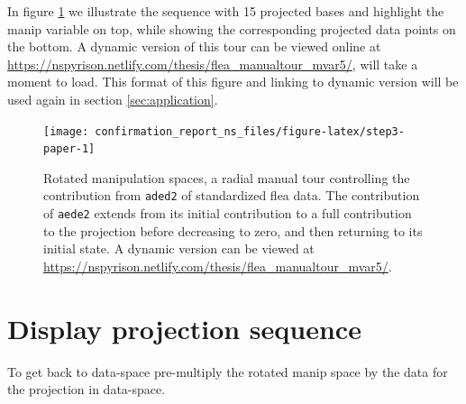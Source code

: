 \documentclass{monashthesis}
\begin{document}
\begin{Shaded}
\begin{Highlighting}[]
 
\StringTok{ }\OperatorTok{+}\StringTok{ }
\StringTok{ }\NormalTok{(manip_space, theta, phi)[, }\OperatorTok{:}\NormalTok{]}
\NormalTok{\}}
\end{Highlighting}
\end{Shaded}

In figure \ref{fig:step3-paper} we illustrate the sequence with 15
projected bases and highlight the manip variable on top, while showing
the corresponding projected data points on the bottom. A dynamic version
of this tour can be viewed online at
\url{https://nspyrison.netlify.com/thesis/flea_manualtour_mvar5/}, will
take a moment to load. This format of this figure and linking to dynamic
version will be used again in section \ref{sec:application}.









\begin{figure}

{\centering \texttt{[image: confirmation\_report\_ns\_files/figure-latex/step3-paper-1]} 

}

\caption{Rotated manipulation spaces, a radial manual tour
controlling the contribution from \texttt{aded2} of standardized flea
data. The contribution of \texttt{aede2} extends from its initial
contribution to a full contribution to the projection before decreasing
to zero, and then returning to its initial state. A dynamic version can
be viewed at
\url{https://nspyrison.netlify.com/thesis/flea_manualtour_mvar5/}.}\label{fig:step3-paper}
\end{figure}

\section{Display projection
sequence}\label{display-projection-sequence-1}

To get back to data-space pre-multiply the rotated manip space by the
data for the projection in data-space.
\end{document}
